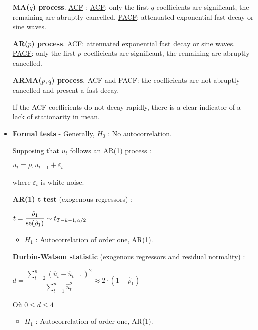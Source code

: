 \begin{f}[Detection]
\begin{itemize}[leftmargin=*]
	
	\textbf{MA(\(q\)) process}. \underline{ACF} : \underline{ACF}: only the first \(q\) coefficients are significant, the remaining are abruptly cancelled. \underline{PACF}: attenuated exponential fast decay or sine waves.
	
	\textbf{AR(\(p\)) process}. \underline{ACF}: attenuated exponential fast decay or sine waves. \underline{PACF}: only the first \(p\) coefficients are significant, the remaining are abruptly cancelled.

	
	\textbf{ARMA(\(p, q\)) process}. \underline{ACF} and \underline{PACF}: the coefficients are not abruptly cancelled and present a fast decay.
	
	If the ACF coefficients do not decay rapidly, there is a clear indicator of a lack of stationarity in mean.
	
	\item \textbf{Formal tests} - Generally, \(H_{0}\) : No autocorrelation.
	
	Supposing that \(u_{t}\) follows an AR(1) process :
	
	\begin{center}
		\(u_{t} = \rho_{1} u_{t - 1} + \varepsilon_{t}\)
	\end{center}
	
	where \(\varepsilon_{t}\) is white noise.
	
	\textbf{AR(1) t test} (exogenous regressors) :
	
	\begin{center}
		\(t = \dfrac{\hat{\rho}_{1}}{\mathrm{se}(\hat{\rho}_{1})} \sim t_{T - k - 1, \alpha/2}\)
	\end{center}
	
	\begin{itemize}[leftmargin=*]
		\item \(H_{1}\) : Autocorrelation of order one, AR(1).
	\end{itemize}
	
	\textbf{Durbin-Watson statistic} (exogenous regressors and residual normality) :
	
	\begin{center}
		\(d = \dfrac{\sum_{t=2}^{n} (\hat{u}_{t} - \hat{u}_{t - 1})^{2}}{\sum_{t=1}^{n} \hat{u}_{t}^{2}} \approx 2 \cdot (1 - \hat{\rho}_{1})\)
	\end{center}
	
	Où \(0 \leq d \leq 4\)
	
	\begin{itemize}[leftmargin=*]
		\item \(H_{1}\) : Autocorrelation of order one, AR(1).
	\end{itemize}
	

\end{itemize}
\end{f}
